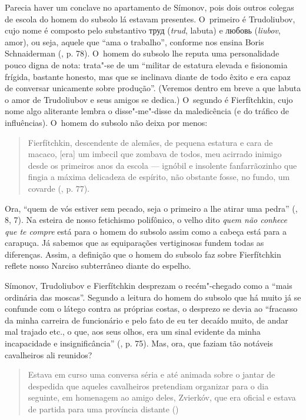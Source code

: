 Parecia haver um conclave no apartamento de Símonov, pois dois outros
colegas de escola do homem do subsolo lá estavam presentes. O~primeiro é
Trudoliubov, cujo nome é composto pelo substantivo
труд (\emph{trud},
labuta) e любовь
(\emph{liubov}, amor), ou seja, aquele que ``ama o trabalho'', conforme
nos ensina Boris Schnaiderman (, p. 78). O~homem do subsolo lhe
reputa uma personalidade pouco digna de nota: trata"-se de um ``militar
de estatura elevada e fisionomia frígida, bastante honesto, mas que se
inclinava diante de todo êxito e era capaz de conversar unicamente sobre
produção''. (Veremos dentro em breve a que labuta o amor de Trudoliubov
e seus amigos se dedica.) O~segundo é Fierfítchkin, cujo nome algo
aliterante lembra o disse"-me"-disse da maledicência (e do tráfico de
influências). O~homem do subsolo não deixa por menos:

\begin{quote}
Fierfítchkin, descendente de alemães, de pequena estatura e cara de
macaco, {[}era{]} um imbecil que zombava de todos, meu acirrado inimigo
desde os primeiros anos da escola --- ignóbil e insolente fanfarrãozinho
que fingia a máxima delicadeza de espírito, não obstante fosse, no
fundo, um covarde (, p. 77).
\end{quote}

Ora, ``quem de vós estiver sem pecado, seja o primeiro a lhe atirar uma
pedra'' (, 8, 7). Na esteira de nosso fetichismo polifônico, o velho
dito \emph{quem não conhece que te compre} está para o homem do subsolo
assim como a cabeça está para a carapuça. Já sabemos que as equiparações
vertiginosas fundem todas as diferenças. Assim, a definição que o homem
do subsolo faz sobre Fierfítchkin reflete nosso Narciso subterrâneo
diante do espelho.

Símonov, Trudoliubov e Fierfítchkin desprezam o recém"-chegado como a
``mais ordinária das moscas''. Segundo a leitura do homem do subsolo que
há muito já se confunde com o látego contra as próprias costas, o
desprezo se devia ao ``fracasso da minha carreira de funcionário e pelo
fato de eu ter decaído muito, de andar mal trajado etc., o que, aos seus
olhos, era um sinal evidente da minha incapacidade e insignificância''
(, p. 75). Mas, ora, que faziam tão notáveis cavalheiros ali
reunidos?

\begin{quote}
Estava em curso uma conversa séria e até animada sobre o jantar de
despedida que aqueles cavalheiros pretendiam organizar para o dia
seguinte, em homenagem ao amigo deles, Zvierkóv, que era oficial e
estava de partida para uma província distante ()
\end{quote}

